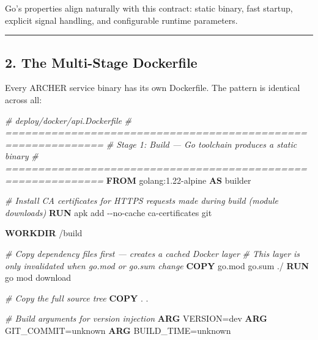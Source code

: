 \documentclass[
]{article}
\newenvironment{Shaded}{}{}
\newcommand{\AttributeTok}[1]{\textcolor[rgb]{0.49,0.56,0.16}{#1}}
\newcommand{\CommentTok}[1]{\textcolor[rgb]{0.38,0.63,0.69}{\textit{#1}}}
\newcommand{\ExtensionTok}[1]{#1}
\newcommand{\KeywordTok}[1]{\textcolor[rgb]{0.00,0.44,0.13}{\textbf{#1}}}
\newcommand{\NormalTok}[1]{#1}
\begin{document}
Go's properties align naturally with this contract: static binary, fast
startup, explicit signal handling, and configurable runtime parameters.

\begin{center}\rule{0.5\linewidth}{0.5pt}\end{center}

\hypertarget{the-multi-stage-dockerfile}{%
\subsection{2. The Multi-Stage
Dockerfile}\label{the-multi-stage-dockerfile}}

Every ARCHER service binary has its own Dockerfile. The pattern is
identical across all:

\begin{Shaded}
\begin{Highlighting}[]
\CommentTok{\# deploy/docker/api.Dockerfile}
\CommentTok{\# =============================================================}
\CommentTok{\# Stage 1: Build — Go toolchain produces a static binary}
\CommentTok{\# =============================================================}
\KeywordTok{FROM}\NormalTok{ golang:1.22{-}alpine }\KeywordTok{AS}\NormalTok{ builder}

\CommentTok{\# Install CA certificates for HTTPS requests made during build (module downloads)}
\KeywordTok{RUN} \ExtensionTok{apk}\NormalTok{ add }\AttributeTok{{-}{-}no{-}cache}\NormalTok{ ca{-}certificates git}

\KeywordTok{WORKDIR}\NormalTok{ /build}

\CommentTok{\# Copy dependency files first — creates a cached Docker layer}
\CommentTok{\# This layer is only invalidated when go.mod or go.sum change}
\KeywordTok{COPY}\NormalTok{ go.mod go.sum ./}
\KeywordTok{RUN} \ExtensionTok{go}\NormalTok{ mod download}

\CommentTok{\# Copy the full source tree}
\KeywordTok{COPY}\NormalTok{ . .}

\CommentTok{\# Build arguments for version injection}
\KeywordTok{ARG}\NormalTok{ VERSION=dev}
\KeywordTok{ARG}\NormalTok{ GIT\_COMMIT=unknown}
\KeywordTok{ARG}\NormalTok{ BUILD\_TIME=unknown}


\end{Highlighting}
\end{Shaded}
\end{document}
